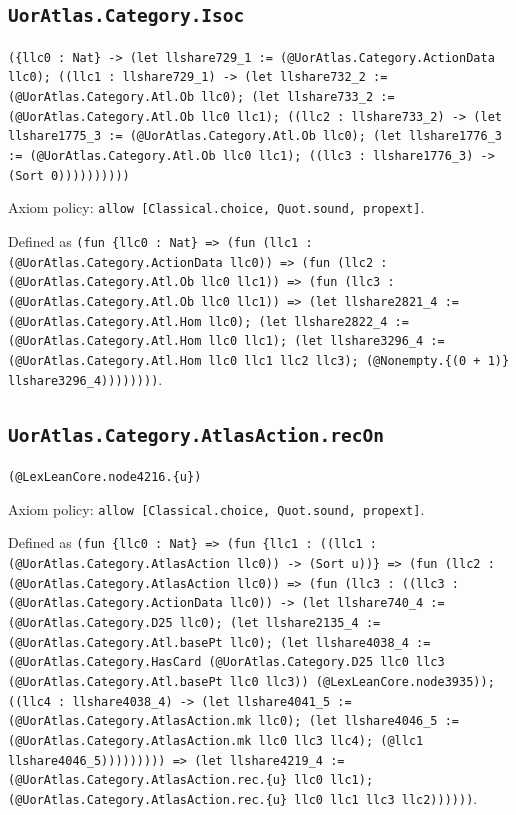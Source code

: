 \documentclass[11pt]{article}
\begin{document}
\subsection*{\texttt{UorAtlas.Category.Isoc}}
\noindent\texttt{(\{llc0 : Nat\} -> (let llshare729\_1 := (@UorAtlas.Category.ActionData llc0); ((llc1 : llshare729\_1) -> (let llshare732\_2 := (@UorAtlas.Category.Atl.Ob llc0); (let llshare733\_2 := (@UorAtlas.Category.Atl.Ob llc0 llc1); ((llc2 : llshare733\_2) -> (let llshare1775\_3 := (@UorAtlas.Category.Atl.Ob llc0); (let llshare1776\_3 := (@UorAtlas.Category.Atl.Ob llc0 llc1); ((llc3 : llshare1776\_3) -> (Sort 0))))))))))}\par
\noindent Axiom policy: \texttt{allow [Classical.choice, Quot.sound, propext]}.\par
\noindent Defined as \texttt{(fun \{llc0 : Nat\} => (fun (llc1 : (@UorAtlas.Category.ActionData llc0)) => (fun (llc2 : (@UorAtlas.Category.Atl.Ob llc0 llc1)) => (fun (llc3 : (@UorAtlas.Category.Atl.Ob llc0 llc1)) => (let llshare2821\_4 := (@UorAtlas.Category.Atl.Hom llc0); (let llshare2822\_4 := (@UorAtlas.Category.Atl.Hom llc0 llc1); (let llshare3296\_4 := (@UorAtlas.Category.Atl.Hom llc0 llc1 llc2 llc3); (@Nonempty.\{(0 + 1)\} llshare3296\_4))))))))}.\par
\subsection*{\texttt{UorAtlas.Category.AtlasAction.recOn}}
\noindent\texttt{(@LexLeanCore.node4216.\{u\})}\par
\noindent Axiom policy: \texttt{allow [Classical.choice, Quot.sound, propext]}.\par
\noindent Defined as \texttt{(fun \{llc0 : Nat\} => (fun \{llc1 : ((llc1 : (@UorAtlas.Category.AtlasAction llc0)) -> (Sort u))\} => (fun (llc2 : (@UorAtlas.Category.AtlasAction llc0)) => (fun (llc3 : ((llc3 : (@UorAtlas.Category.ActionData llc0)) -> (let llshare740\_4 := (@UorAtlas.Category.D25 llc0); (let llshare2135\_4 := (@UorAtlas.Category.Atl.basePt llc0); (let llshare4038\_4 := (@UorAtlas.Category.HasCard (@UorAtlas.Category.D25 llc0 llc3 (@UorAtlas.Category.Atl.basePt llc0 llc3)) (@LexLeanCore.node3935)); ((llc4 : llshare4038\_4) -> (let llshare4041\_5 := (@UorAtlas.Category.AtlasAction.mk llc0); (let llshare4046\_5 := (@UorAtlas.Category.AtlasAction.mk llc0 llc3 llc4); (@llc1 llshare4046\_5))))))))) => (let llshare4219\_4 := (@UorAtlas.Category.AtlasAction.rec.\{u\} llc0 llc1); (@UorAtlas.Category.AtlasAction.rec.\{u\} llc0 llc1 llc3 llc2))))))}.\par
\end{document}
